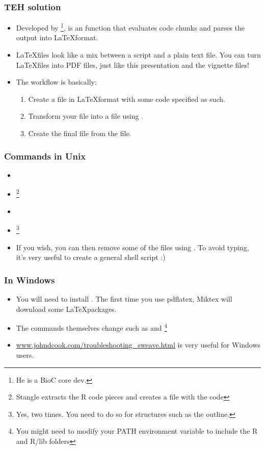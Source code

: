 \begin{frame}[allowframebreaks]
  \frametitle{TEH solution}
  \begin{itemize}
  \item Developed by \footnote{He is a BioC core dev.},  is an  function that evaluates  code chunks and parses the output into \LaTeX format.
  \item \LaTeX files look like a mix between a script and a plain text file. You can turn \LaTeX files into PDF files, just like this presentation and the vignette files!
  \item The workflow is basically:
  \begin{enumerate}
  \item Create a  file in \LaTeX format with some  code specified as such.
  \item Transform your  file into a  file using .
  \item Create the final  file from the  file.
  \end{enumerate}
  \end{itemize}
\end{frame}

\begin{frame}[allowframebreaks]
  \frametitle{Commands in Unix}
  \begin{itemize}
  \item {}
  \item {}\footnote{Stangle extracts the R code pieces and creates a  file with the  code}
  \item {}
  \item {}\footnote{Yes, two times. You need to do so for structures such as the outline.}
  \item If you wish, you can then remove some of the files using . To avoid typing, it's very useful to create a general shell script :)
  \end{itemize}
\end{frame}

\begin{frame}[allowframebreaks]
  \frametitle{In Windows}
  \begin{itemize}
  \item You will need to install . The first time you use pdflatex, Miktex will download some \LaTeX packages.
  \item The commands themselves change such as  and \footnote{You might need to modify your PATH environment variable to include the R and R/lib folders}
  \item \url{www.johndcook.com/troubleshooting_sweave.html} is very useful for Windows users.
  \end{itemize}
\end{frame}

